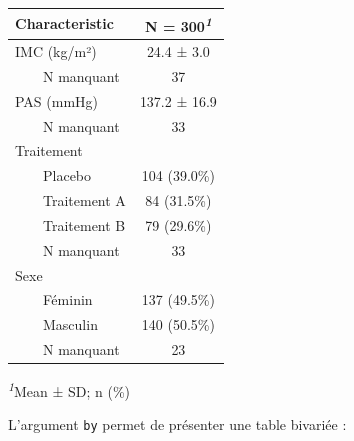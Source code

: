 \documentclass[
]{book}
\begin{document}
\begin{table}[t]
\fontsize{12.0pt}{14.0pt}\selectfont
\begin{tabular*}{\linewidth}{@{\extracolsep{\fill}}lc}
\toprule
\textbf{Characteristic} & \textbf{N = 300}\textsuperscript{\textit{1}} \\ 
\midrule\addlinespace[2.5pt]
IMC (kg/m²) & 24.4 ± 3.0 \\ 
    N manquant & 37 \\ 
PAS (mmHg) & 137.2 ± 16.9 \\ 
    N manquant & 33 \\ 
Traitement &  \\ 
    Placebo & 104 (39.0\%) \\ 
    Traitement A & 84 (31.5\%) \\ 
    Traitement B & 79 (29.6\%) \\ 
    N manquant & 33 \\ 
Sexe &  \\ 
    Féminin & 137 (49.5\%) \\ 
    Masculin & 140 (50.5\%) \\ 
    N manquant & 23 \\ 
\bottomrule
\end{tabular*}
\begin{minipage}{\linewidth}
\vspace{.05em}
\textsuperscript{\textit{1}}Mean ± SD; n (\%)\\
\end{minipage}
\end{table}

L'argument \texttt{by} permet de présenter une table bivariée :
\end{document}
